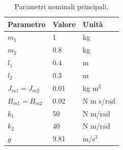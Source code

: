 \begin{table}[H]
\centering
\begin{tabular}{lll}
\toprule
Parametro & Valore & Unità \\
\midrule
$m_1$ & 1 & kg \\
$m_2$ & 0.8 & kg \\
$l_1$ & 0.4 & m \\
$l_2$ & 0.3 & m \\
$J_{m1}=J_{m2}$ & 0.01 & kg m$^2$ \\
$B_{m1}=B_{m2}$ & 0.02 & N m s/rad \\
$k_1$ & 50 & N m/rad \\
$k_2$ & 40 & N m/rad \\
$g$ & 9.81 & m/s$^2$ \\
\bottomrule
\end{tabular}
\caption{Parametri nominali principali.}
\label{tab:nominal-parameters}
\end{table}
